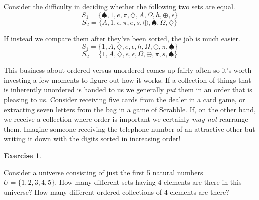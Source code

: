 \documentclass[10pt,]{book}
\theoremstyle{plain}
\theoremstyle{definition}
\theoremstyle{definition}
\newtheorem{exercise}[theorem]{Exercise}
\numberwithin{equation}{section}
\begin{document}
    Consider the difficulty in deciding whether the following two sets are
    equal.
    \begin{equation*}
      S_1 = \{ \spadesuit, 1, e, \pi, \diamondsuit, A, \Omega, h, \oplus, \epsilon \}
    \end{equation*}
    \begin{equation*}
      S_2 = \{ A, 1, \epsilon, \pi, e, s, \oplus,  \spadesuit, \Omega, \diamondsuit \}
    \end{equation*}
\par

    If instead we compare them after they've been sorted, the job is much easier.
    \begin{equation*}
      S_1 = \{1, A, \diamondsuit, e, \epsilon, h, \Omega, \oplus, \pi, \spadesuit \}
    \end{equation*}
    \begin{equation*}
      S_2 = \{1, A, \diamondsuit, e, \epsilon, \Omega, \oplus, \pi, s, \spadesuit \}
    \end{equation*}
\par

    This business about ordered versus unordered comes up fairly often so it's
    worth investing a few moments to figure out how it works. If a collection
    of things that is inherently unordered is handed to us we generally \emph{put}
    them in an order that is pleasing to us. Consider receiving five cards
    from the dealer in a card game, or extracting seven letters from the bag
    in a game of Scrabble. If, on the other hand, we receive
    a collection where order
    is important we certainly \emph{may not} rearrange them. Imagine someone
    receiving the telephone number of an attractive other but writing it down
    with the digits sorted in increasing order!
\begin{exercise}\label{exercise-31}

        Consider a universe consisting of just the first 5 natural numbers
        \(U = \{ 1, 2, 3, 4, 5 \}\). How many different sets having 4 elements
        are there in this universe? How many different ordered collections of 4
        elements are there?
\end{exercise}
\par
\end{document}
